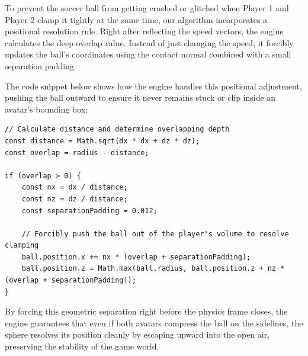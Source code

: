 To prevent the soccer ball from getting crushed or glitched when Player 1 and Player 2 clamp it tightly at the same time, our algorithm incorporates a positional resolution rule. Right after reflecting the speed vectors, the engine calculates the deep overlap value. Instead of just changing the speed, it forcibly updates the ball's coordinates using the contact normal combined with a small separation padding. 

The code snippet below shows how the engine handles this positional adjustment, pushing the ball outward to ensure it never remains stuck or clip inside an avatar's bounding box:

\begin{lstlisting}[style=vscode_JS]
// Calculate distance and determine overlapping depth
const distance = Math.sqrt(dx * dx + dz * dz);
const overlap = radius - distance;

if (overlap > 0) {
    const nx = dx / distance;
    const nz = dz / distance;
    const separationPadding = 0.012;

    // Forcibly push the ball out of the player's volume to resolve clamping
    ball.position.x += nx * (overlap + separationPadding);
    ball.position.z = Math.max(ball.radius, ball.position.z + nz * (overlap + separationPadding));
}
\end{lstlisting}

By forcing this geometric separation right before the physics frame closes, the engine guarantees that even if both avatars compress the ball on the sidelines, the sphere resolves its position cleanly by escaping upward into the open air, preserving the stability of the game world.